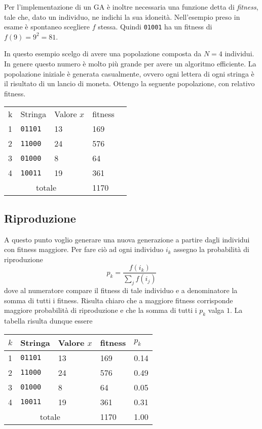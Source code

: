 \documentclass[a4paper, 11pt]{article}
\newcommand{\code}{\texttt}
\begin{document}
Per l'implementazione di un GA è inoltre necessaria una funzione detta di
\textit{fitness}, tale che, dato un individuo, ne indichi la sua idoneità.
Nell'esempio preso in esame è spontaneo scegliere $f$ stessa. Quindi
\code{01001}  ha un fitness di $f(9)=9^2=81$.

In questo esempio scelgo di avere una popolazione composta da $N=4$ individui. In
genere questo numero è molto più grande per avere un algoritmo efficiente. La
popolazione iniziale è generata casualmente, ovvero ogni lettera di ogni stringa
è il risultato di un lancio di moneta. Ottengo la seguente popolazione, con
relativo fitness.

\begin{table}[h!]
\begin{tabular}{lllll}
\multicolumn{1}{l|}{k} & Stringa      & Valore $x$ & fitness &  \\ \cline{1-4}
\multicolumn{1}{l|}{1} & \code{01101} & 13         & 169     &  \\
\multicolumn{1}{l|}{2} & \code{11000} & 24         & 576     &  \\
\multicolumn{1}{l|}{3} & \code{01000} & 8          & 64      &  \\
\multicolumn{1}{l|}{4} & \code{10011} & 19         & 361     &  \\ \cline{1-4}
\multicolumn{3}{c}{totale}                         & 1170    & 
\end{tabular}
\end{table}



\subsection{Riproduzione}

A questo punto voglio generare una nuova generazione a partire dagli individui
con fitness maggiore. Per fare ciò ad ogni individuo $i_k$  assegno la
probabilità di riproduzione 
$$p_k=\frac{f(i_k)}{\sum\limits_{j}f(i_j)}$$
dove al numeratore compare il fitness di tale individuo e a denominatore la
somma di tutti i fitness. Risulta chiaro che a maggiore fitness corrisponde
maggiore probabilità di riproduzione e che la somma di tutti i $p_k$ valga $1$.
La tabella risulta dunque essere

\begin{table}[h!]
\begin{tabular}{lllll}
\multicolumn{1}{l|}{$k$} & Stringa        & Valore $x$ & fitness & $p_k$ \\ \hline
\multicolumn{1}{l|}{1}   & \code{01101} & 13         & 169     & 0.14  \\
\multicolumn{1}{l|}{2}   & \code{11000} & 24         & 576     & 0.49  \\
\multicolumn{1}{l|}{3}   & \code{01000} & 8          & 64      & 0.05  \\
\multicolumn{1}{l|}{4}   & \code{10011} & 19         & 361     & 0.31  \\ \hline
\multicolumn{3}{c}{totale}                           & 1170    & 1.00 
\end{tabular}
\end{table}
\end{document}
